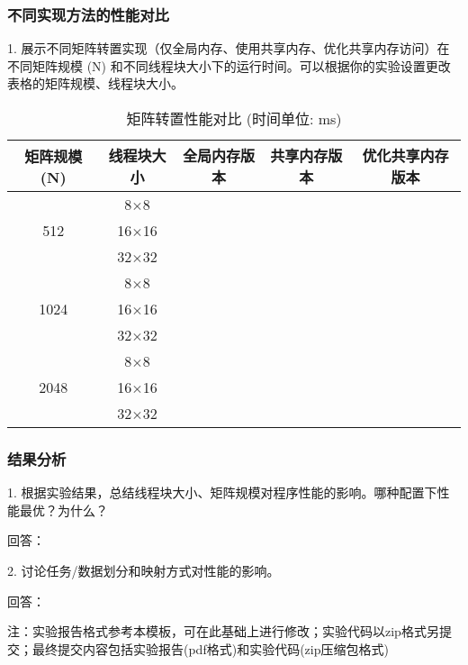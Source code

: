 \documentclass{SYSUReport}
\begin{document}
\subsubsection{不同实现方法的性能对比}
1. 展示不同矩阵转置实现（仅全局内存、使用共享内存、优化共享内存访问）在不同矩阵规模 (N) 和不同线程块大小下的运行时间。可以根据你的实验设置更改表格的矩阵规模、线程块大小。
\begin{table}[h!]
\centering
\caption{矩阵转置性能对比 (时间单位: ms)}
\begin{tabular}{|c|c|c|c|c|}
\hline
矩阵规模 (N) & 线程块大小 & 全局内存版本 & 共享内存版本 & 优化共享内存版本 \\
\hline
\multirow{3}{*}{512} & 8$\times$8 & & & \\
\cline{2-5} %
& 16$\times$16 & & & \\
\cline{2-5}
& 32$\times$32 & & & \\
\hline
\multirow{3}{*}{1024} & 8$\times$8 & & & \\
\cline{2-5}
& 16$\times$16 & & & \\
\cline{2-5}
& 32$\times$32 & & & \\
\hline
\multirow{3}{*}{2048} & 8$\times$8 & & & \\
\cline{2-5}
& 16$\times$16 & & & \\
\cline{2-5}
& 32$\times$32 & & & \\
\hline
\end{tabular}
\end{table}
\subsubsection{结果分析}
1. 根据实验结果，总结线程块大小、矩阵规模对程序性能的影响。哪种配置下性能最优？为什么？

回答：

2. 讨论任务/数据划分和映射方式对性能的影响。

回答：

注：实验报告格式参考本模板，可在此基础上进行修改；实验代码以zip格式另提交；最终提交内容包括实验报告(pdf格式)和实验代码(zip压缩包格式)
\end{document}
